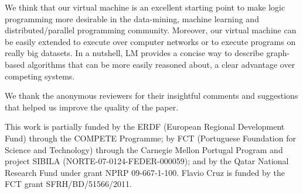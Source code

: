 \documentclass{sigplanconf}
\begin{document}
We think that our virtual machine is an excellent starting point to make
logic programming more desirable in the data-mining, machine learning and
distributed/parallel programming community. Moreover, our virtual machine can
be easily extended to execute over computer networks or to execute programs on really big datasets.
In a nutshell, LM provides a concise way to describe
graph-based algorithms that can be more easily reasoned about, a clear advantage over
competing systems.
 
\makeatletter{}\acks

We thank the anonymous reviewers for their insightful comments and suggestions
that helped us improve the quality of the paper.

This work is partially funded by the ERDF (European Regional
Development Fund) through the COMPETE Programme; by FCT (Portuguese
Foundation for Science and Technology) through the Carnegie Mellon
Portugal Program and project SIBILA (NORTE-07-0124-FEDER-000059); and
by the Qatar National Research Fund under grant NPRP
09-667-1-100. Flavio Cruz is funded by the FCT grant
SFRH/BD/51566/2011.
 

\balance



\end{document}
